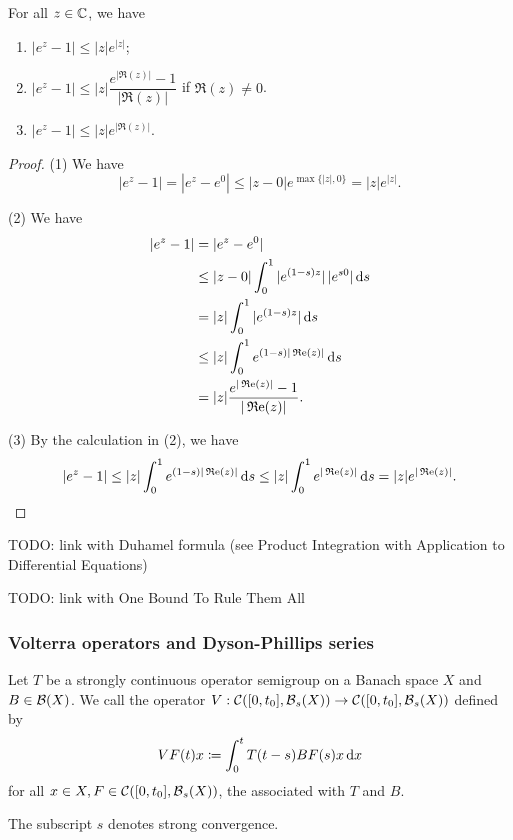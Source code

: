 \begin{corollary} \label{expZMinusOneInequality}
For all $z\in \mathbb{C}$, we have
\begin{enumerate}
\item $|e^z - 1| \leq |z|e^{|z|}$;
\item $|e^z - 1| \leq |z| \dfrac{e^{|\Re(z)|} - 1}{|\Re(z)|}$ if $\Re(z) \neq 0$.
\item $|e^z - 1| \leq |z|e^{|\Re(z)|}$.
\end{enumerate}
\end{corollary}
\begin{proof}
(1) We have
\[ |e^z - 1| = |e^z - e^{0}| \leq |z-0|e^{\max\{|z|,0\}} = |z|e^{|z|}. \]

(2) We have
\begin{align*}
|e^z - 1| &= |e^z - e^0| \\
&\leq |z - 0|\int_0^1|e^{(1-s)z}|\,|e^{s0}|\operatorname{d \!}{s} \\
&= |z| \int_0^1 |e^{(1-s)z}| \operatorname{d \!}{s} \\
&\leq |z| \int_0^1 e^{(1-s)|\operatorname{\mathfrak{R}e}(z)|} \operatorname{d \!}{s} \\
&= |z| \frac{e^{|\operatorname{\mathfrak{R}e}(z)|} - 1}{|\operatorname{\mathfrak{R}e}(z)|}.
\end{align*}

(3) By the calculation in (2), we have
\[ |e^z - 1| \leq |z| \int_0^1 e^{(1-s)|\operatorname{\mathfrak{R}e}(z)|} \operatorname{d \!}{s} \leq |z| \int_0^1 e^{|\operatorname{\mathfrak{R}e}(z)|} \operatorname{d \!}{s} = |z|e^{|\operatorname{\mathfrak{R}e}(z)|}. \]
\end{proof}

TODO: link with Duhamel formula (see Product Integration with Application to Differential Equations)

TODO: link with One Bound To Rule Them All

\subsubsection{Volterra operators and Dyson-Phillips series}
\begin{definition}
Let $T$ be a strongly continuous operator semigroup on a Banach space $X$ and $B\in\operatorname{\mathcal{B}}(X)$. We call the operator $V: \operatorname{\mathcal{C}}([0,t_0], \operatorname{\mathcal{B}}_s(X)) \to \operatorname{\mathcal{C}}([0,t_0], \operatorname{\mathcal{B}}_s(X))$ defined by
\[ VF(t)x \coloneqq \int_0^tT(t-s)BF(s)x\operatorname{d \!}{x} \]
for all $x\in X, F\in \operatorname{\mathcal{C}}([0,t_0], \operatorname{\mathcal{B}}_s(X))$,
the  associated with $T$ and $B$.
\end{definition}
The subscript $s$ denotes strong convergence.

